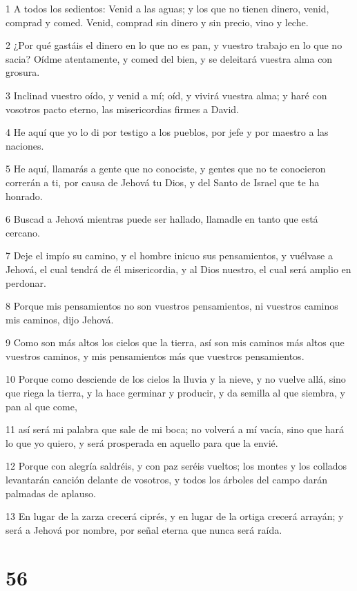 \par 1 A todos los sedientos: Venid a las aguas; y los que no tienen dinero, venid, comprad y comed. Venid, comprad sin dinero y sin precio, vino y leche.
\par 2 ¿Por qué gastáis el dinero en lo que no es pan, y vuestro trabajo en lo que no sacia? Oídme atentamente, y comed del bien, y se deleitará vuestra alma con grosura.
\par 3 Inclinad vuestro oído, y venid a mí; oíd, y vivirá vuestra alma; y haré con vosotros pacto eterno, las misericordias firmes a David. 
\par 4 He aquí que yo lo di por testigo a los pueblos, por jefe y por maestro a las naciones.
\par 5 He aquí, llamarás a gente que no conociste, y gentes que no te conocieron correrán a ti, por causa de Jehová tu Dios, y del Santo de Israel que te ha honrado.
\par 6 Buscad a Jehová mientras puede ser hallado, llamadle en tanto que está cercano.
\par 7 Deje el impío su camino, y el hombre inicuo sus pensamientos, y vuélvase a Jehová, el cual tendrá de él misericordia, y al Dios nuestro, el cual será amplio en perdonar.
\par 8 Porque mis pensamientos no son vuestros pensamientos, ni vuestros caminos mis caminos, dijo Jehová.
\par 9 Como son más altos los cielos que la tierra, así son mis caminos más altos que vuestros caminos, y mis pensamientos más que vuestros pensamientos.
\par 10 Porque como desciende de los cielos la lluvia y la nieve, y no vuelve allá, sino que riega la tierra, y la hace germinar y producir, y da semilla al que siembra, y pan al que come,
\par 11 así será mi palabra que sale de mi boca; no volverá a mí vacía, sino que hará lo que yo quiero, y será prosperada en aquello para que la envié.
\par 12 Porque con alegría saldréis, y con paz seréis vueltos; los montes y los collados levantarán canción delante de vosotros, y todos los árboles del campo darán palmadas de aplauso.
\par 13 En lugar de la zarza crecerá ciprés, y en lugar de la ortiga crecerá arrayán; y será a Jehová por nombre, por señal eterna que nunca será raída.

\chapter{56}

